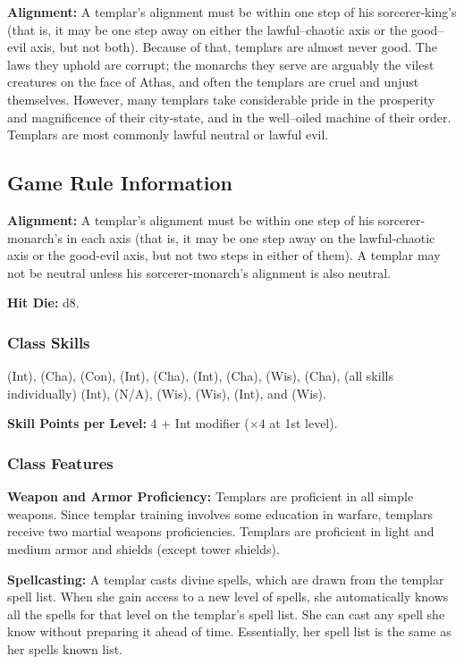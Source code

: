 \textbf{Alignment:} A templar's alignment must be within one step of his sorcerer-king's (that is, it may be one step away on either the lawful--chaotic axis or the good--evil axis, but not both). Because of that, templars are almost never good. The laws they uphold are corrupt; the monarchs they serve are arguably the vilest creatures on the face of Athas, and often the templars are cruel and unjust themselves. However, many templars take considerable pride in the prosperity and magnificence of their city-state, and in the well--oiled machine of their order. Templars are most commonly lawful neutral or lawful evil.

\subsection{Game Rule Information}
\textbf{Alignment:} A templar's alignment must be within one step of his sorcerer-monarch's in each axis (that is, it may be one step away on the lawful-chaotic axis or the good-evil axis, but not two steps in either of them). A templar may not be neutral unless his sorcerer-monarch's alignment is also neutral.

\textbf{Hit Die:} d8.

\subsubsection{Class Skills}
 (Int),  (Cha),  (Con),  (Int),  (Cha),  (Int),  (Cha),  (Wis),  (Cha),  (all skills individually) (Int),  (N/A),  (Wis),  (Wis),  (Int), and  (Wis).

\textbf{Skill Points per Level:} 4 + Int modifier ($\times 4$ at 1st level).

\subsubsection{Class Features}
\textbf{Weapon and Armor Proficiency:} Templars are proficient in all simple weapons. Since templar training involves some education in warfare, templars receive two martial weapons proficiencies. Templars are proficient in light and medium armor and shields (except tower shields).

\textbf{Spellcasting:} A templar casts divine spells, which are drawn from the templar spell list. When she gain access to a new level of spells, she automatically knows all the spells for that level on the templar's spell list. She can cast any spell she know without preparing it ahead of time. Essentially, her spell list is the same as her spells known list.

